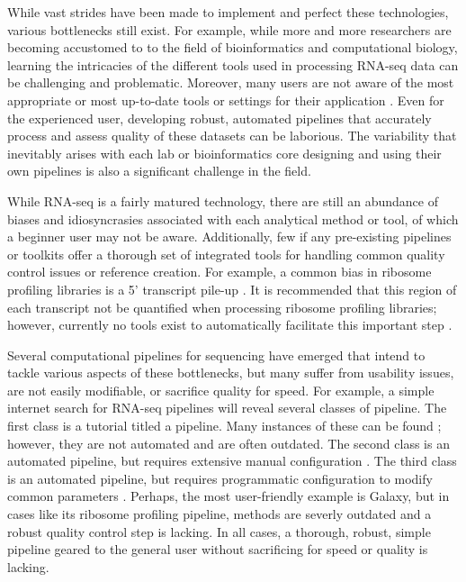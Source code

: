 \documentclass[11pt, a4paper, oneside]{article}
\begin{document}
While vast strides have been made to implement and perfect these technologies, various bottlenecks still exist. For example, while more and more researchers are becoming accustomed to to the field of bioinformatics and computational biology, learning the intricacies of the different tools used in processing RNA-seq data can be challenging and problematic. Moreover, many users are not aware of the most appropriate or most up-to-date tools or settings for their application \cite{costello_npjsba, funari_science}. Even for the experienced user, developing robust, automated pipelines that accurately process and assess quality of these datasets can be laborious. The variability that inevitably arises with each lab or bioinformatics core designing and using their own pipelines is also a significant challenge in the field. \par

While RNA-seq is a fairly matured technology, there are still an abundance of biases and idiosyncrasies associated with each analytical method or tool, of which a beginner user may not be aware. Additionally, few if any pre-existing pipelines or toolkits offer a thorough set of integrated tools for handling common quality control issues or reference creation. For example, a common bias in ribosome profiling libraries is a 5' transcript pile-up \cite{gerashchenko_nar, artieri_gr, hussman_plosg}. It is recommended that this region of each transcript not be quantified when processing ribosome profiling libraries; however, currently no tools exist to automatically facilitate this important step \cite{ingolia_meth, weinberg_reports}. \par

Several computational pipelines for sequencing have emerged that intend to tackle various aspects of these bottlenecks, but many suffer from usability issues, are not easily modifiable, or sacrifice quality for speed. For example, a simple internet search for RNA-seq pipelines will reveal several classes of pipeline. The first class is a tutorial titled a pipeline. Many instances of these can be found \cite{encode_pipeline, gdc_pipeline}; however, they are not automated and are often outdated. The second class is an automated pipeline, but requires extensive manual configuration \cite{pavlidis_pipeline, nfcore_pipeline, umcu_pipeline, cellgeni_pipeline}. The third class is an automated pipeline, but requires programmatic configuration to modify common parameters \cite{dnanexus_pipeline, nextflow_pipeline}. Perhaps, the most user-friendly example is Galaxy, but in cases like its ribosome profiling pipeline, methods are severly outdated and a robust quality control step is lacking. In all cases, a thorough, robust, simple pipeline geared to the general user without sacrificing for speed or quality is lacking. \par
\end{document}
